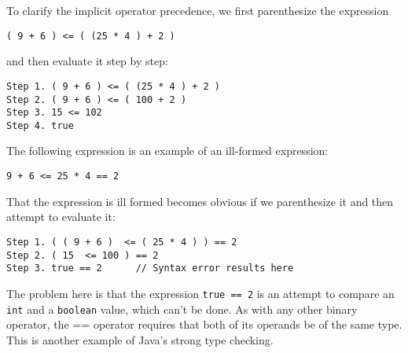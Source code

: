 \noindent To clarify the implicit operator precedence, we
first parenthesize the 
\mbox{expression}

\begin{jjjlisting}
\begin{lstlisting}
( 9 + 6 ) <= ( (25 * 4 ) + 2 )
\end{lstlisting}
\end{jjjlisting}

\noindent and then evaluate it step by step:

\begin{jjjlisting}
\begin{lstlisting}
Step 1. ( 9 + 6 ) <= ( (25 * 4 ) + 2 )
Step 2. ( 9 + 6 ) <= ( 100 + 2 )
Step 3. 15 <= 102
Step 4. true
\end{lstlisting}
\end{jjjlisting}

\noindent The following expression is an example of an ill-formed expression:

\begin{jjjlisting}
\begin{lstlisting}
9 + 6 <= 25 * 4 == 2
\end{lstlisting}
\end{jjjlisting}

\noindent That the expression is ill formed
 becomes obvious if we parenthesize it and then attempt to evaluate
it:

\begin{jjjlisting}
\begin{lstlisting}
Step 1. ( ( 9 + 6 )  <= ( 25 * 4 ) ) == 2
Step 2. ( 15  <= 100 ) == 2
Step 3. true == 2      // Syntax error results here
\end{lstlisting}
\end{jjjlisting}

\noindent The problem here is that the expression
{\tt true == 2} is an attempt to compare an {\tt int} and a
{\tt boolean} value, which can't be done.  As with any other binary
operator, the == operator requires that both
of its operands be of the
same type.  This is another example of Java's strong type checking.


\label{self-study-exercises}

